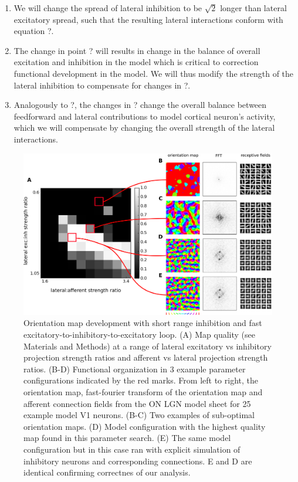 \documentclass[a4paper,10pt]{article}
\begin{document}
\begin{enumerate}

\item We will change the spread of lateral inhibition to be $\sqrt{2}$ longer than lateral excitatory spread, such that the resulting lateral
interactions conform with equation ?.

\item The change in point ? will results in change in the balance of overall excitation and inhibition in the model which is critical 
to correction functional development in the model. We will thus modify the strength of the lateral inhibition to compensate for changes in ?.

\item Analogously to ?, the changes in ? change the overall balance between feedforward and lateral contributions to model cortical neuron's activity, 
which we will compensate by changing the overall strength of the lateral interactions.

\end{enumerate} 

\begin{figure}[htpb!] 
\centering
\includegraphics[width=16cm]{./SVG/Figure1/figure1.png}
\caption{Orientation map development with short range inhibition and fast excitatory-to-inhibitory-to-excitatory loop. (A) Map quality (see Materials and Methods) at a range of 
lateral excitatory vs inhibitory projection strength ratios and afferent vs lateral projection strength ratios. (B-D) Functional organization in 3 example parameter configurations 
indicated by the red marks. From left to right, the orientation map, fast-fourier transform of the orientation map and afferent connection fields from the ON LGN model sheet for 25 example model V1 neurons. 
(B-C) Two examples of sub-optimal orientation maps. (D) Model configuration with the highest quality map found in this parameter search. (E) The same model configuration but in this case ran with explicit
simulation of inhibitory neurons and corresponding connections. E and D are identical confirming correctnes of our analysis.}
\label{fig:figure1}
\end{figure} 
\end{document}
